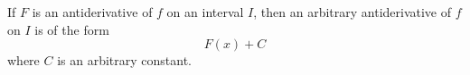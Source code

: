 \begin{frame}
\begin{theorem}
If $F$ is an antiderivative of $f$ on an interval $I$, then an arbitrary antiderivative of $f$ on $I$ is of the form
\[
F(x) + C
\]
where $C$ is an arbitrary constant.
\end{theorem}
\end{frame}
